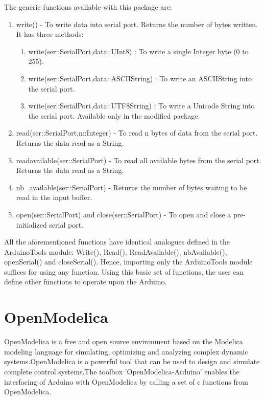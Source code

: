The generic functions available with this package are:
\begin{enumerate}
      \item write() - To write data into serial port. Returns the number of bytes written.
            It has three methods:
            \begin{enumerate}
                  \item write(ser::SerialPort,data::UInt8) :
                        To write a single Integer byte (0 to 255).
                  \item write(ser::SerialPort,data::ASCIIString) :
                        To write an ASCIIString into the serial port.
                  \item write(ser::SerialPort,data::UTF8String) :
                        To write a Unicode String into the serial port. Available only in the
                        modified package.
            \end{enumerate}
            
      \item read(ser::SerialPort,n::Integer) - To read n bytes of data from the serial
            port. Returns the data read as a String.
            
      \item readavailable(ser::SerialPort) - To read all available bytes from the serial
            port. Returns the data read as a String. 
            
      \item nb\_available(ser::SerialPort) - Returns the number of bytes waiting to be read
            in the input buffer.
            
      \item open(ser::SerialPort) and close(ser::SerialPort) - To open and close a
            pre-initialized serial port.   
            
\end{enumerate}

All the aforementioned functions have identical analogues defined in
the ArduinoTools module:  Write(), Read(), ReadAvailable(),
nbAvailable(), openSerial() and closeSerial(). Hence, importing only
the ArduinoTools module suffices for using any function. Using this
basic set of functions, the user can define other functions to operate
upon the Arduino.





\section{OpenModelica}
\label{sec:OpenModelica-start}
OpenModelica is a free and open source environment based on the Modelica modeling language for simulating, optimizing and analyzing complex
dynamic systems.OpenModelica is a powerful tool that can be used to design and
simulate complete control systems.The toolbox 'OpenModelica-Arduino'
enables the interfacing of Arduino with OpenModelica by calling a set of c functions
from OpenModelica.   




